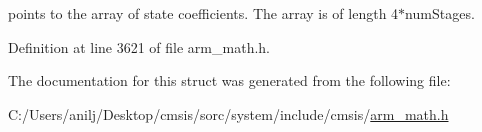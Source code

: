 points to the array of state coefficients. The array is of length 4$\ast$num\+Stages. 

Definition at line 3621 of file arm\+\_\+math.\+h.



The documentation for this struct was generated from the following file\+:\begin{DoxyCompactItemize}
\item 
C\+:/\+Users/anilj/\+Desktop/cmsis/sorc/system/include/cmsis/\hyperlink{arm__math_8h}{arm\+\_\+math.\+h}\end{DoxyCompactItemize}
